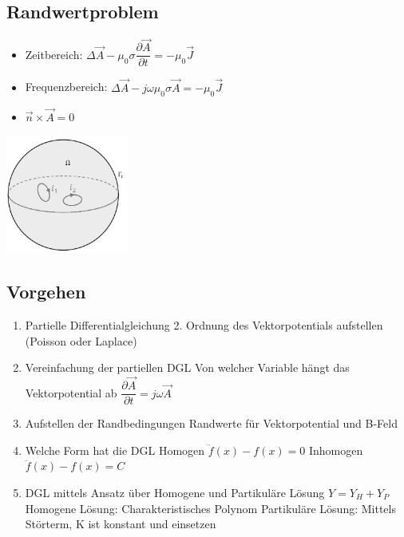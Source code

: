 \subsection{Randwertproblem}
\begin{minipage}{9cm}
	\begin{itemize}
		\item Zeitbereich: $\Delta\vec{A}-\mu_{0}\sigma \dfrac{\partial \vec{A}}{\partial
		 t}=-\mu_{0}\vec{J}$
		\item Frequenzbereich: $\Delta\vec{A}-j\omega\mu_{0}\sigma\vec{A}=-\mu_{0}\vec{J}$
		\item $\vec{n} \times \vec{A} =0$
	\end{itemize}	
\end{minipage}
\begin{minipage}{8cm}
	\includegraphics[width=4cm]{images/Randwertproblem.jpg}
\end{minipage}
\subsection{Vorgehen}
	\begin{enumerate}
		\item Partielle Differentialgleichung 2. Ordnung des Vektorpotentials aufstellen (Poisson oder Laplace)
		\item Vereinfachung der partiellen DGL
		\subitem Von welcher Variable hängt das Vektorpotential ab
		\subitem $\dfrac{\partial \vec{A}}{\partial t}= j\omega\vec{A} $
		\item Aufstellen der Randbedingungen
		\subitem Randwerte für Vektorpotential und B-Feld
		\item Welche Form hat die DGL 
		\subitem Homogen $\ddot{f}(x) - f(x)=0$
		\subitem Inhomogen $\ddot{f}(x) - f(x)=C$
		\item DGL mittels Ansatz über Homogene und Partikuläre Lösung $Y=Y_{H}+Y_{P}$
		\subitem Homogene Lösung: Charakteristisches Polynom
		\subitem Partikuläre Lösung: Mittels Störterm, K ist konstant und einsetzen
	\end{enumerate}
\clearpage
\pagebreak
